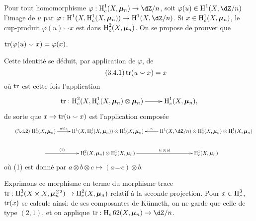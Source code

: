 \subsection{}\label{V:3-3}

Pour tout homomorphisme $\varphi:\h_c^1(X,\dmu_n)\to \dZ/n$, soit 
$\varphi(u)\in \h^1(X,\dZ/n)$ l'image de $u$ par 
$\varphi:\h^1(X,\h_c^1(X,\dmu_n)) \to \h^1(X,\dZ/n)$. Si 
$x\in \operatorname{H}_c^1(X,{\bm\mu}_n)$, le cup-produit $\varphi(u)\smallsmile x$ est dans 
$\operatorname{H}_c^2(X,{\bm\mu}_n)$. On se propose de prouver que 





\begin{proposition_}\label{V:3-4}
$\operatorname{tr}(\varphi(u)\smallsmile x) = \varphi(x)$.
\end{proposition_}

Cette identit\'e se d\'eduit, par application de $\varphi$, de 
\begin{equation*}\tag{3.4.1}\label{V:eq:3-4-1}
  \operatorname{tr}(u\smallsmile x) = x 
\end{equation*}
o\`u $\operatorname{tr}$ est cette fois l'application 
\[\xymatrix{
  \tr:\h_c^2(X,\h_c^1(X,\dmu_n)\otimes\dmu_n) \ar[r] 
    & \h_c^1(X,\dmu_n) \text{,}
}\]
de sorte que $x\mapsto \operatorname{tr}(u\smallsmile x)$ est l'application compos\'ee 
\begin{equation*}\tag{3.4.2}\label{V:eq:3-4-2}
\xymatrix{
  \h_c^1(X,\dmu_n) \ar[r]^-{u\otimes x} 
    & \h^1(X,\h_c^1(X,\dmu_n)) \otimes \h_c^1(X,\dmu_n) 
    & \ar[l]_-\sim \h^1(X,\dZ/n)\otimes \h_c^1(X,\dmu_n) \otimes \h_c^1(X,\dmu_n) \\
    \ar[r]^-{(1)} 
      & \h_c^2(X,\dmu_n) \otimes \h_c^1(X,\dmu_n) \ar[r]^-{\tr\otimes\operatorname{id}} 
      & \h_c^1(X,\dmu_n)
}
\end{equation*}
o\`u (1) est donn\'e par 
$a\otimes b\otimes c\mapsto (a\smallsmile c)\otimes b$. 

Exprimons ce morphisme en terme du morphisme trace 
$\operatorname{tr}:\operatorname{H}_c^3(X\times X,{\bm\mu}_n^{\otimes 2}) \to \operatorname{H}_c^2(X,{\bm\mu}_n)$ relatif \`a la 
seconde projection. Pour $x\in \operatorname{H}_c^3$, $\operatorname{tr}(x)$ se calcule ainsi: de ses 
composantes de K\"unneth, on ne garde que celle de type $(2,1)$, et on applique 
$\tr:\h_c62(X,\dmu_n) \to \dZ/n$. 


